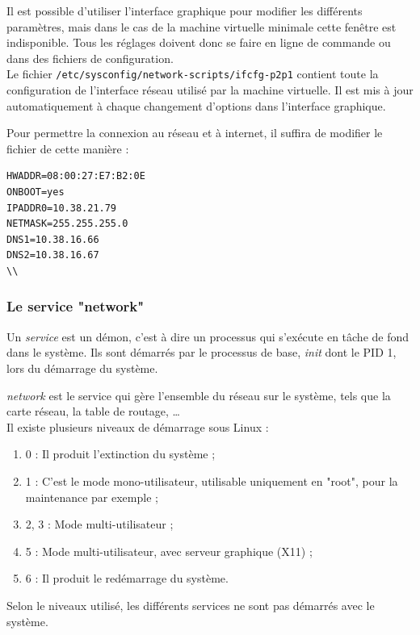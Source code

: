 
Il est possible d'utiliser l'interface graphique pour modifier les différents paramètres, mais dans le cas de la machine virtuelle minimale cette fenêtre est indisponible.
Tous les réglages doivent donc se faire en ligne de commande ou dans des fichiers de configuration.
\\


Le fichier \lstinline{/etc/sysconfig/network-scripts/ifcfg-p2p1} contient toute la configuration de l'interface réseau utilisé par la machine virtuelle.
Il est mis à jour automatiquement à chaque changement d'options dans l'interface graphique.

Pour permettre la connexion au réseau et à internet, il suffira de modifier le fichier de cette manière :
\begin{lstlisting}
HWADDR=08:00:27:E7:B2:0E
ONBOOT=yes
IPADDR0=10.38.21.79
NETMASK=255.255.255.0
DNS1=10.38.16.66
DNS2=10.38.16.67
\\
\end{lstlisting}




\subsubsection{Le service "network"}
\label{Le service "network"}

Un \textit{service} est un démon, c'est à dire un processus qui s'exécute en tâche de fond dans le système.
Ils sont démarrés par le processus de base, \textit{init} dont le PID 1, lors du démarrage du système.

\textit{network} est le service qui gère l'ensemble du réseau sur le système, tels que la carte réseau, la table de routage, \ldots
\\


Il existe plusieurs niveaux de démarrage sous Linux :
\begin{enumerate}
	\item 0 : Il produit l'extinction du système ;
	\item 1 : C'est le mode mono-utilisateur, utilisable uniquement en "root", pour la maintenance par exemple ;
	\item 2, 3 : Mode multi-utilisateur ;
	\item 5 : Mode multi-utilisateur, avec serveur graphique (X11) ;
	\item 6 : Il produit le redémarrage du système.
\end{enumerate}
Selon le niveaux utilisé, les différents services ne sont pas démarrés avec le système.

